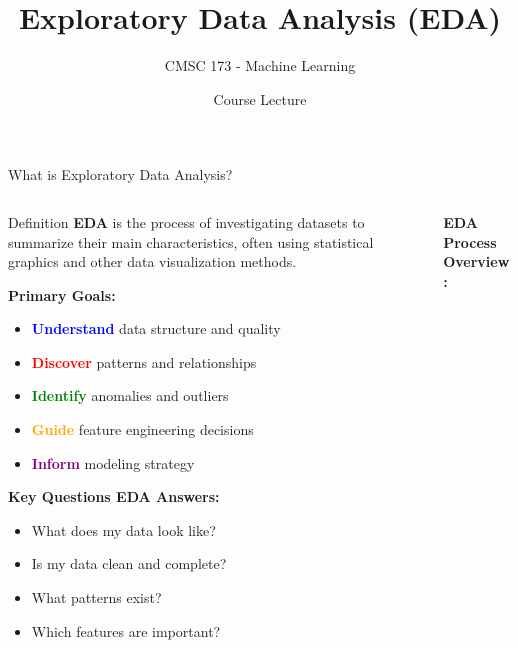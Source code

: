 \documentclass[8pt,aspectratio=1610]{beamer}
\title{Exploratory Data Analysis (EDA)}
\subtitle{CMSC 173 - Machine Learning}
\author{Course Lecture}
\date{}
\begin{document}
\begin{frame}
\titlepage
\end{frame}

\begin{frame}{What is Exploratory Data Analysis?}
\begin{columns}[t]
\begin{column}{0.48\textwidth}
\begin{block}{Definition}
\textbf{EDA} is the process of investigating datasets to summarize their main characteristics, often using statistical graphics and other data visualization methods.
\end{block}

\vspace{0.3cm}
\textbf{Primary Goals:}
\begin{itemize}
\setlength{\itemsep}{1pt}
\item \textcolor{blue}{\textbf{Understand}} data structure and quality
\item \textcolor{red}{\textbf{Discover}} patterns and relationships
\item \textcolor{green}{\textbf{Identify}} anomalies and outliers
\item \textcolor{orange}{\textbf{Guide}} feature engineering decisions
\item \textcolor{purple}{\textbf{Inform}} modeling strategy
\end{itemize}

\vspace{0.3cm}
\textbf{Key Questions EDA Answers:}
\begin{itemize}
\setlength{\itemsep}{1pt}
\item What does my data look like?
\item Is my data clean and complete?
\item What patterns exist?
\item Which features are important?
\end{itemize}
\end{column}

\begin{column}{0.48\textwidth}
\textbf{EDA Process Overview:}
\vspace{0.2cm}

\end{column}
\end{columns}
\end{frame}
\end{document}
